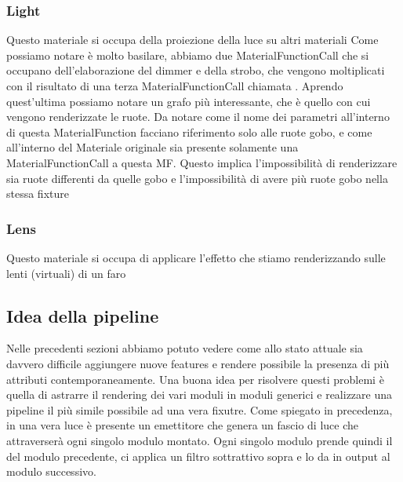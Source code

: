 \documentclass[main.tex]{subfiles}
\begin{document}

\subsubsection{Light}\label{subsec:2_1_light}
Questo materiale si occupa della proiezione della luce su altri materiali
Come possiamo notare è molto basilare, abbiamo due MaterialFunctionCall che si occupano dell'elaborazione del dimmer e della strobo, che vengono moltiplicati con il risultato di una terza MaterialFunctionCall chiamata . Aprendo quest'ultima possiamo notare un grafo più interessante, che è quello con cui vengono renderizzate le ruote.
Da notare come il nome dei parametri all'interno di questa MaterialFunction facciano riferimento solo alle ruote gobo, e come all'interno del Materiale originale sia presente solamente una MaterialFunctionCall a questa MF. Questo implica l'impossibilità di renderizzare sia ruote differenti da quelle gobo e l'impossibilità di avere più ruote gobo nella stessa fixture

\subsubsection{Lens}\label{subsec:2_1_lens}
Questo materiale si occupa di applicare l'effetto che stiamo renderizzando sulle lenti (virtuali) di un faro %


\subsection{Idea della pipeline}\label{subsec:2_pipelineIdea}
Nelle precedenti sezioni abbiamo potuto vedere come allo stato attuale sia davvero difficile aggiungere nuove features e rendere possibile la presenza di più attributi contemporaneamente. Una buona idea per risolvere questi problemi è quella di astrarre il rendering dei vari moduli in moduli generici e realizzare una pipeline il più simile possibile ad una vera fixutre. Come spiegato in precedenza, in una vera luce è presente un emettitore che genera un fascio di luce che attraverserà ogni singolo modulo montato. Ogni singolo modulo prende quindi il  del modulo precedente, ci applica un filtro sottrattivo sopra e lo da in output al modulo successivo. \newline
\end{document}
